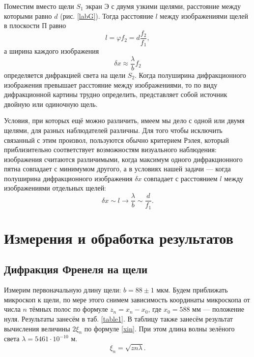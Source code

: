 \documentclass[a4paper,12pt]{article} %
\begin{document}
Поместим вместо щели $S_1$ экран Э с двумя узкими щелями, расстояние между которыми равно $d$ (рис. \ref{labG}). Тогда расстояние $l$ между изображениями щелей в плоскости П равно
\begin{equation}
l = \varphi f_2 = d \dfrac{f_2}{f_1},
\end{equation}
а ширина каждого изображения
\begin{equation}
\delta x \approx \dfrac{\lambda}{b} f_2
\end{equation}
определяется дифракцией света на щели $S_2$. Когда полуширина дифракционного изображения превышает расстояние между изображениями, то по виду дифракционной картины трудно определить, представляет собой источник двойную или одиночную щель.

Условия, при которых ещё можно различить, имеем мы дело с одной или двумя щелями, для разных наблюдателей различны. Для того чтобы исключить связанный с этим произвол, пользуются обычно критерием Рэлея, который приблизительно соответствует возможностям визуального наблюдения: изображения считаются различимыми, когда максимум одного дифракционного пятна совпадает с минимумом другого, а в условиях нашей задачи --- когда полуширина дифракционного изображения $\delta x$ совпадает с расстоянием $l$ между изображениями отдельных щелей:
\begin{equation}
\delta x \sim l \to \dfrac{\lambda}{b} \sim \dfrac{d}{f_1}.
\end{equation}

\section{Измерения и обработка результатов}

\subsection{Дифракция Френеля на щели}

Измерим первоначальную длину щели: $ b = 88 \pm 1$ мкм. Будем приближать микроскоп к щели, по мере этого снимем зависимость координаты микроскопа от числа $ n  $ тёмных полос по формуле $ z_n = x_n - x_0 $, где $ x_0 = 588 $ мм --- положение нуля. Результаты занесём в таб. \ref{table1}. В таблицу также занесём результат вычисления величины $ 2\xi_n $ по формуле \eqref{xin}. При этом длина волны зелёного света $ \lambda = 5461 \cdot 10^{-10} $ м. 
\begin{equation}
\xi_n = \sqrt{zn\lambda}.
\end{equation}
\end{document}

